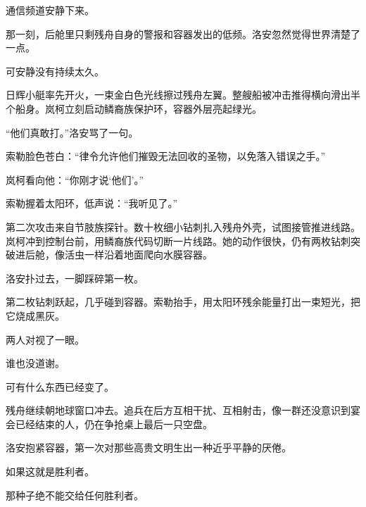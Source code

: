 通信频道安静下来。

那一刻，后舱里只剩残舟自身的警报和容器发出的低频。洛安忽然觉得世界清楚了一点。

可安静没有持续太久。

日辉小艇率先开火，一束金白色光线擦过残舟左翼。整艘船被冲击推得横向滑出半个船身。岚柯立刻启动鳞裔族保护环，容器外层亮起绿光。

“他们真敢打。”洛安骂了一句。

索勒脸色苍白：“律令允许他们摧毁无法回收的圣物，以免落入错误之手。”

岚柯看向他：“你刚才说‘他们’。”

索勒握着太阳环，低声说：“我听见了。”

第二次攻击来自节肢族探针。数十枚细小钻刺扎入残舟外壳，试图接管推进线路。岚柯冲到控制台前，用鳞裔族代码切断一片线路。她的动作很快，仍有两枚钻刺突破进后舱，像活虫一样沿着地面爬向水膜容器。

洛安扑过去，一脚踩碎第一枚。

第二枚钻刺跃起，几乎碰到容器。索勒抬手，用太阳环残余能量打出一束短光，把它烧成黑灰。

两人对视了一眼。

谁也没道谢。

可有什么东西已经变了。

残舟继续朝地球窗口冲去。追兵在后方互相干扰、互相射击，像一群还没意识到宴会已经结束的人，仍在争抢桌上最后一只空盘。

洛安抱紧容器，第一次对那些高贵文明生出一种近乎平静的厌倦。

如果这就是胜利者。

那种子绝不能交给任何胜利者。
